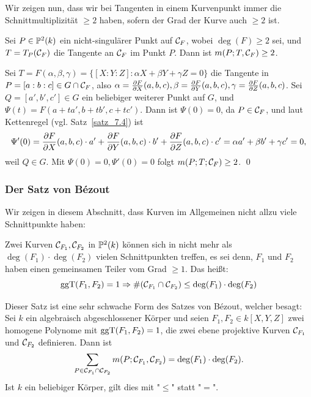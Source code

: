 Wir zeigen nun, dass wir bei Tangenten in einem Kurvenpunkt immer die Schnittmultiplizität $\geq 2$ haben, sofern der Grad der Kurve auch $\geq 2$ ist.
\begin{satz}
\label{satz_9.22}
	Sei $P \in \mathbb{P}^2(k)$ ein nicht-singulärer Punkt auf $\mathcal{C}_F$, wobei $\deg(F) \geq 2$ sei, und $T = T_P(\mathcal{C}_F)$ die Tangente an $\mathcal{C}_F$ im Punkt $P$. 
	Dann ist $m(P;T,\mathcal{C}_F) \geq 2$.
\end{satz}

	Sei $T = F(\alpha,\beta,\gamma) = \{[X:Y:Z] : \alpha X + \beta Y + \gamma Z = 0\}$ die Tangente in $P = [a:b:c] \in G \cap \mathcal{C}_F$, also $\alpha = \frac{\partial F}{\partial X}(a,b,c), \beta = \frac{\partial F}{\partial Y}(a,b,c), \gamma = \frac{\partial F}{\partial Z}(a,b,c)$. 
	Sei $Q = [a',b',c'] \in G$ ein beliebiger weiterer Punkt auf $G$, und $\Psi(t) = F(a+ta',b+tb',c+tc')$. 
	Dann ist $\Psi(0) = 0$, da $P \in \mathcal{C}_F$, und laut Kettenregel (vgl. Satz~\ref{satz_7.4}) ist
	\[ \Psi'(0) = \frac{\partial F}{\partial X}(a,b,c) \cdot a' + \frac{\partial F}{\partial Y}(a,b,c) \cdot b' + \frac{\partial F}{\partial Z}(a,b,c) \cdot c' = \alpha a' + \beta b' + \gamma c' = 0, \]
	weil $Q \in G$. 
	Mit $\Psi(0) = 0, \Psi'(0)=0$ folgt $m(P;T;\mathcal{C}_F) \geq 2$. \qed

\nextlecture	
\subsubsection{Der Satz von Bézout}
\label{subsub:2.3.2}
	Wir zeigen in diesem Abschnitt, dass Kurven im Allgemeinen nicht allzu viele Schnittpunkte haben: \marginnote{[10]}

\begin{satz}
\label{satz_10.1}
	Zwei Kurven $\mathcal{C}_{F_1}, \mathcal{C}_{F_2}$ in $\mathbb{P}^2(k)$ können sich in nicht mehr als $\deg(F_1) \cdot \deg(F_2)$ vielen Schnittpunkten treffen, es sei denn, $F_1$ und $F_2$ haben einen gemeinsamen Teiler vom Grad $\geq 1$. 
	Das heißt: 
	\[ \operatorname{ggT}(F_1,F_2) = 1 \Rightarrow \#(\mathcal{C}_{F_1} \cap \mathcal{C}_{F_2}) \leq \deg(F_1) \cdot \deg(F_2) \]
\end{satz}

\begin{bem}
\label{bem_10.2}
	Dieser Satz ist eine sehr schwache Form des Satzes von Bézout, welcher besagt: \\
	Sei $k$ ein algebraisch abgeschlossener Körper und seien $F_1,F_2 \in k[X,Y,Z]$ zwei homogene Polynome mit $\operatorname{ggT}(F_1,F_2) = 1$, die zwei ebene projektive Kurven $\mathcal{C}_{F_1}$ und $\mathcal{C}_{F_2}$ definieren. 
	Dann ist
	\[ 
	\sum_{P \in \mathcal{C}_{F_1} \cap \mathcal{C}_{F_2}} m(P;\mathcal{C}_{F_1},\mathcal{C}_{F_2}) = \deg(F_1) \cdot \deg(F_2). 
	\]
	Ist $k$ ein beliebiger Körper, gilt dies mit "$\leq$" statt "$=$".
\end{bem}

